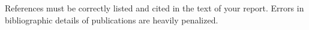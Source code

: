 





\onehalfspacing








\onecolumn

\nocite{*} %

\printbibliography

\textbf{}
References must be correctly listed and cited in the text of your report.
Errors in bibliographic details of publications are heavily penalized.


